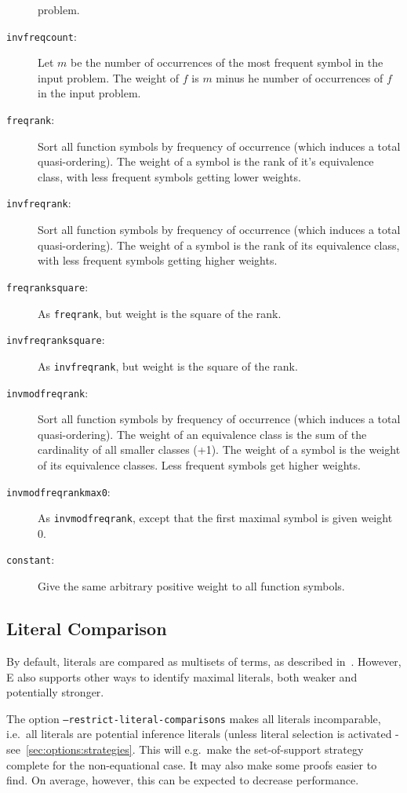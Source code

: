\documentclass{report}
\begin{document}
\begin{description}
  problem.
\item[\texttt{invfreqcount}:]  Let $m$ be the number of occurrences of
  the most frequent symbol in the input problem. The weight of $f$ is
  $m$ minus he number of occurrences of $f$ in the input problem.
\item[\texttt{freqrank}:] Sort all function symbols by frequency of
  occurrence (which induces a total quasi-ordering). The weight of a
  symbol is the rank of it's equivalence class, with less frequent
  symbols getting lower weights.
\item[\texttt{invfreqrank}:] Sort all function symbols by frequency of
  occurrence (which induces a total quasi-ordering). The weight of a
  symbol is the rank of its equivalence class, with less frequent
  symbols getting higher weights.
\item[\texttt{freqranksquare}:] As \texttt{freqrank}, but weight is
  the square of the rank.
\item[\texttt{invfreqranksquare}:] As \texttt{invfreqrank}, but weight is
  the square of the rank.
\item[\texttt{invmodfreqrank}:] Sort all function symbols by frequency of
  occurrence (which induces a total quasi-ordering). The weight of an
   equivalence class is the sum of the cardinality of all smaller
  classes (+1). The weight of a symbol is the weight of its
  equivalence classes. Less frequent symbols get higher weights.
\item[\texttt{invmodfreqrankmax0}:] As \texttt{invmodfreqrank}, except
  that the first maximal symbol is given weight 0.
\item[\texttt{constant}:] Give the same arbitrary positive weight to
  all function symbols.
\end{description}

\subsection{Literal Comparison}
\label{sec:options:litcmp}

By default, literals are compared as
multisets of terms, as described in~\cite{BG94}. However, E also
supports other ways to identify maximal literals, both weaker and
potentially stronger.

The option \texttt{--restrict-literal-comparisons} makes all literals
incomparable, i.e.\ all literals are potential inference literals
(unless literal selection is activated -
see~\ref{sec:options:strategies}. This will e.g.\ make the
set-of-support strategy complete for the non-equational case. It may
also make some proofs easier to find. On average, however, this can be
expected to decrease performance.
\end{document}
